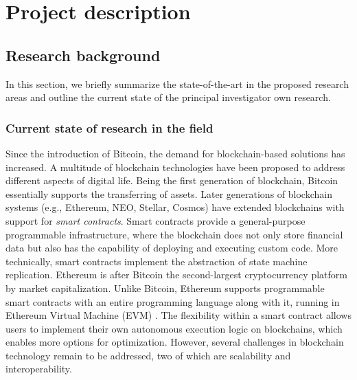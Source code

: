 \newpage
\setcounter{page}{1}
\section{Project description}

\subsection{Research background}

In this section, we briefly summarize the state-of-the-art in the proposed
research areas and outline the current state of the principal investigator own
research.

\subsubsection{Current state of research in the field}

Since the introduction of Bitcoin, the demand for blockchain-based solutions has
increased. A multitude of blockchain technologies have been proposed to address
different aspects of digital life. 
Being the first generation of blockchain, Bitcoin essentially supports the
transferring of assets. Later generations of blockchain systems (e.g., Ethereum,
NEO, Stellar, Cosmos) have extended blockchains with support for \emph{smart
contracts}. Smart contracts provide a general-purpose programmable
infrastructure, where the blockchain does not only store financial data but also
has the capability of deploying and executing custom code. More technically,
smart contracts implement the abstraction of state machine replication. Ethereum
is after Bitcoin the second-largest cryptocurrency platform by market
capitalization. Unlike Bitcoin, Ethereum supports programmable smart contracts
with an entire programming language along with it, running in Ethereum Virtual
Machine (EVM) \cite{ethereum:evm}. The flexibility within a smart contract
allows users to implement their own autonomous execution logic on blockchains,
which enables more options for optimization. However, several challenges in
blockchain technology remain to be addressed, two of which are scalability and
interoperability.

